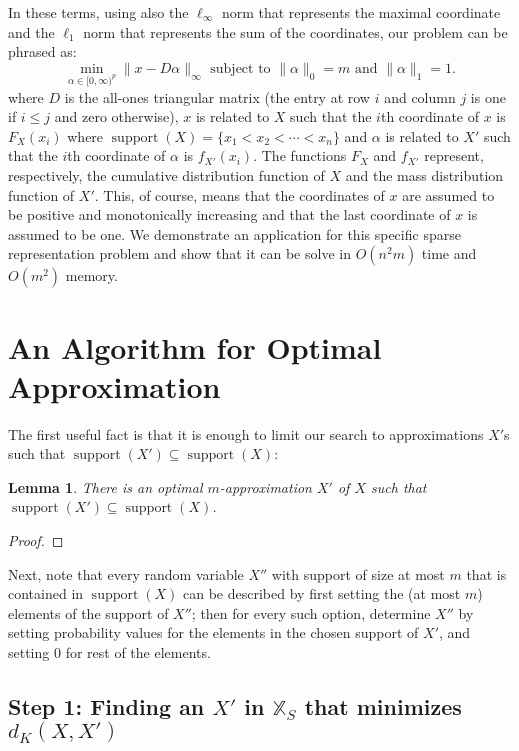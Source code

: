 \documentclass{article}
\newtheorem{lemma}[thm]{Lemma}
\DeclareMathOperator{\support}{support}
\begin{document}
In these terms, using also the $\ell_\infty$ norm that represents the maximal coordinate and the $\ell_1$ norm that represents the sum of the coordinates, our problem can be phrased as:
$$
\min_{\alpha \in [0,\infty)^p}\|x - D\alpha\|_{\infty} \text{ subject to }  \|\alpha\|_0 = m \text{ and } \|\alpha\|_1=1.
$$
where $D$ is the all-ones triangular matrix (the entry at row $i$ and column $j$ is one if $i\leq j$ and zero otherwise), $x$ is related to $X$ such that the $i$th coordinate of $x$ is $F_X(x_i)$ where $\support(X)=\{x_1 < x_2 < \cdots < x_n\}$ and $\alpha$ is related to $X'$ such that the $i$th coordinate of $\alpha$ is $f_{X'}(x_i)$. The functions $F_X$ and $f_{X'}$ represent, respectively, the cumulative distribution function of $X$ and the mass distribution function of $X'$. This, of course, means that the coordinates of $x$ are assumed to be positive and monotonically increasing and that the last coordinate of $x$ is assumed to be one. We demonstrate an application for this specific sparse representation problem and show that it can be solve in $O(n^2m)$ time and $O(m^2)$ memory.




\section{An Algorithm for Optimal Approximation}\label{sec:alg}

The first useful fact is that it is enough to limit our search to approximations $X'$s such that $\support(X') \subseteq \support(X)$:

\begin{lemma}\label{lem:supContained}
	There is an optimal $m$-approximation $X'$ of $X$ such that $\support(X') \subseteq \support(X)$.
\end{lemma}
\begin{proof}
\end{proof}


Next, note that every random variable $X''$ with support of size at most $m$ that is contained in $\support(X)$ can be described by first setting the (at most $m$) elements of the support of $X''$; then for every such option, determine $X''$ by setting probability values for the elements in the chosen support of $X'$, and setting $0$ for rest of the elements.


\subsection{Step 1: Finding an $X'$ in $\mathbb{X}_S$ that minimizes $d_K(X,X')$}
\end{document}
